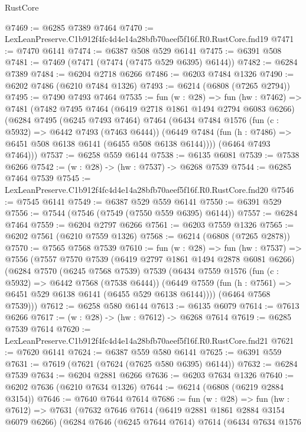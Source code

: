 \begin{lexlean}{RustCore}
\begin{coremodule}
@7469 := @6285 @7389 @7464
@7470 := LexLeanPreserve.C1b912f4fc4d4e14a28bfb70aeef5f16f.R0.RustCore.fnd19
@7471 := @7470 @6141
@7474 := @6387 @508 @529 @6141
@7475 := @6391 @508
@7481 := @7469 (@7471 (@7474 (@7475 @529 @6395) @6144))
@7482 := @6284 @7389
@7484 := @6204 @2718 @6266
@7486 := @6203 @7484 @1326
@7490 := @6202 @7486 (@6210 @7484 @1326)
@7493 := @6214 (@6808 (@7265 @2794))
@7495 := @7490 @7493 @7464
@7535 := fun (w : @28) =>
  fun (hw : @7462) =>
  @7481
    (@7482
      @7495
      @7464
      (@6419 @2718 @1861 @1494 @2794 @6083 @6266)
      (@6284
        @7495
        (@6245 @7493 @7464)
        @7464
        (@6434
          @7484
          @1576
          (fun (c : @5932) => @6442 @7493 (@7463 @6444))
          (@6449 @7484 (fun (h : @7486) => @6451 @508 @6138 @6141 (@6455 @508 @6138 @6144))))
        (@6464 @7493 @7464)))
@7537 := @6258 @559 @6144
@7538 := @6135 @6081
@7539 := @7538 @6266
@7542 := (w : @28) -> (hw : @7537) -> @6268 @7539
@7544 := @6285 @7464 @7539
@7545 := LexLeanPreserve.C1b912f4fc4d4e14a28bfb70aeef5f16f.R0.RustCore.fnd20
@7546 := @7545 @6141
@7549 := @6387 @529 @559 @6141
@7550 := @6391 @529
@7556 := @7544 (@7546 (@7549 (@7550 @559 @6395) @6144))
@7557 := @6284 @7464
@7559 := @6204 @2797 @6266
@7561 := @6203 @7559 @1326
@7565 := @6202 @7561 (@6210 @7559 @1326)
@7568 := @6214 (@6808 (@7265 @2878))
@7570 := @7565 @7568 @7539
@7610 := fun (w : @28) =>
  fun (hw : @7537) =>
  @7556
    (@7557
      @7570
      @7539
      (@6419 @2797 @1861 @1494 @2878 @6081 @6266)
      (@6284
        @7570
        (@6245 @7568 @7539)
        @7539
        (@6434
          @7559
          @1576
          (fun (c : @5932) => @6442 @7568 (@7538 @6444))
          (@6449 @7559 (fun (h : @7561) => @6451 @529 @6138 @6141 (@6455 @529 @6138 @6144))))
        (@6464 @7568 @7539)))
@7612 := @6258 @580 @6144
@7613 := @6135 @6079
@7614 := @7613 @6266
@7617 := (w : @28) -> (hw : @7612) -> @6268 @7614
@7619 := @6285 @7539 @7614
@7620 := LexLeanPreserve.C1b912f4fc4d4e14a28bfb70aeef5f16f.R0.RustCore.fnd21
@7621 := @7620 @6141
@7624 := @6387 @559 @580 @6141
@7625 := @6391 @559
@7631 := @7619 (@7621 (@7624 (@7625 @580 @6395) @6144))
@7632 := @6284 @7539
@7634 := @6204 @2881 @6266
@7636 := @6203 @7634 @1326
@7640 := @6202 @7636 (@6210 @7634 @1326)
@7644 := @6214 (@6808 (@6219 @2884 @3154))
@7646 := @7640 @7644 @7614
@7686 := fun (w : @28) =>
  fun (hw : @7612) =>
  @7631
    (@7632
      @7646
      @7614
      (@6419 @2881 @1861 @2884 @3154 @6079 @6266)
      (@6284
        @7646
        (@6245 @7644 @7614)
        @7614
        (@6434
          @7634
          @1576

\end{coremodule}
\end{lexlean}
